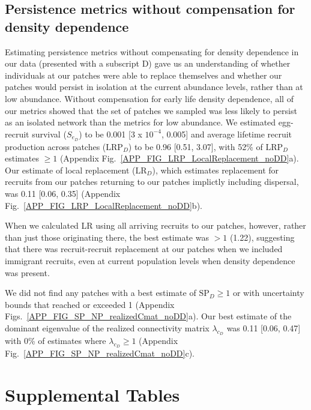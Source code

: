 \documentclass[12pt, oneside]{article}   	%
\begin{document}
\subsection{Persistence metrics without compensation for density dependence} \label{APP_SEC_RESULTS_noDD}

Estimating persistence metrics without compensating for density dependence in our data (presented with a subscript D) gave us an understanding of whether individuals at our patches were able to replace themselves and whether our patches would persist in isolation at the current abundance levels, rather than at low abundance. Without compensation for early life density dependence, all of our metrics showed that the set of patches we sampled was less likely to persist as an isolated network than the metrics for low abundance. We estimated egg-recruit survival ($S_{e_{D}}$) to be 0.001 [3 x $10^{-4}$, 0.005] and average lifetime recruit production across patches ($\text{LRP}_{D}$) to be 0.96 [0.51, 3.07], with 52\% of $\text{LRP}_{D}$ estimates $\geq 1$ (Appendix Fig.\ \ref{APP_FIG_LRP_LocalReplacement_noDD}a). Our estimate of local replacement ($\text{LR}_{D}$), which estimates replacement for recruits from our patches returning to our patches implictly including dispersal, was 0.11 [0.06, 0.35] (Appendix Fig.\ \ref{APP_FIG_LRP_LocalReplacement_noDD}b). 

When we calculated LR using all arriving recruits to our patches, however, rather than just those originating there, the best estimate was $> 1$ (1.22), suggesting that there was recruit-recruit replacement at our patches when we included immigrant recruits, even at current population levels when density dependence was present.

We did not find any patches with a best estimate of $\text{SP}_{D} \geq 1$ or with uncertainty bounds that reached or exceeded 1 (Appendix Figs.\ \ref{APP_FIG_SP_NP_realizedCmat_noDD}a). Our best estimate of the dominant eigenvalue of the realized connectivity matrix $\lambda_{c_{D}}$ was 0.11 [0.06, 0.47] with 0\% of estimates where $\lambda_{c_{D}} \geq 1$ (Appendix Fig.\ \ref{APP_FIG_SP_NP_realizedCmat_noDD}c). 

\newpage{}

\section{Supplemental Tables} \label{APP_SEC_TABLES}
\end{document}
